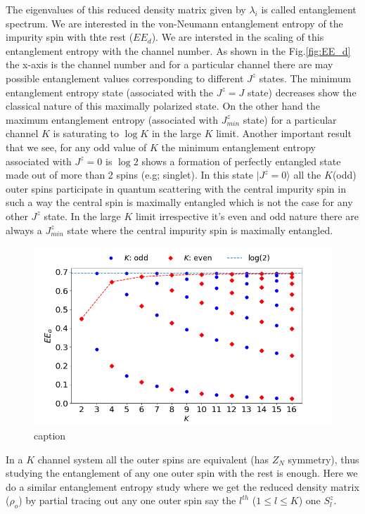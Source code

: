 \documentclass[reprint,prb,superscriptaddress]{revtex4-1}
\begin{document}
\noindent The eigenvalues of this reduced density matrix given by $\lambda_i$ is called entanglement spectrum. We are interested in the von-Neumann entanglement entropy of the impurity spin with thte rest ($EE_d$). We are intersted in the scaling of this entanglement entropy with the channel number. As shown in the Fig.\ref{fig:EE_d} the x-axis is the channel number and for a particular channel there are may possible entanglement values corresponding to different $J^z$ states. The minimum entanglement entropy state (associated with the $J^z=J$ state) decreases show the classical nature of this maximally polarized state. On the other hand the maximum entanglement entropy (associated with $J^z_{min}$ state) for a particular channel $K$ is saturating to $\log K$ in the large $K$ limit. Another important result that we see, for any odd value of $K$ the minimum entanglement entropy associated with $J^z=0$ is $\log 2$ shows a formation of perfectly entangled state made out of more than 2 spins (e.g; singlet). In this state $|J^z=0\rangle$ all the $K$(odd) outer spins participate in quantum scattering with the central impurity spin in such a way the central spin is maximally entangled which is not the case for any other $J^z$ state. In the large $K$ limit irrespective it's even and odd nature there are always a $J^z_{min}$ state where the central impurity spin is maximally entangled.
\begin{figure}[!h]
\centering
\includegraphics[scale=0.32]{plt/outer_EE_multi_channel_ANN.png}
\caption{caption}
\label{fig:EE_outer}
\end{figure}
In a $K$ channel system all the outer spins are equivalent (has $Z_N$ symmetry), thus studying the entanglement of any one outer spin with the rest is enough. Here we do a similar entanglement entropy study where we get the reduced density matrix ($\rho_o$) by partial tracing out any one outer spin say the $l^{th}$ ($1\leq l \leq K$) one $S^z_{l}$. 
\end{document}
